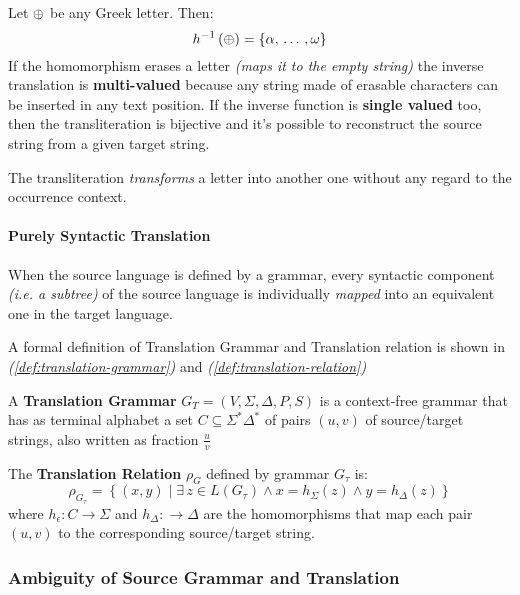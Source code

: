 \documentclass[english]{article}
\begin{document}
Let \(\oplus\) be any Greek letter.
Then:
\[ h^{-1}\left( \oplus \right) = \left\{ \alpha, \,\ldots\,, \omega \right\} \]
If the homomorphism erases a letter \textit{(maps it to the empty string)} the inverse translation is \textbf{multi-valued} because any string made of erasable characters can be inserted in any text position.
If the inverse function is \textbf{single valued} too, then the transliteration is bijective and it's possible to reconstruct the source string from a given target string.

\bigskip
The transliteration \textit{transforms} a letter into another one without any regard to the occurrence context.

\paragraph{Purely Syntactic Translation}

When the source language is defined by a grammar, every syntactic component \textit{(i.e. a subtree)} of the source language is individually \textit{mapped} into an equivalent one in the target language.

A formal definition of Translation Grammar and Translation relation is shown in \textit{(\ref{def:translation-grammar})} and \textit{(\ref{def:translation-relation})}

\begin{definition}
  \label{def:translation-grammar}
  A \textbf{Translation Grammar} \(G_T = \left( V, \Sigma, \Delta, P, S \right)\) is a context-free grammar that has as terminal alphabet a set \(C \subseteq \Sigma^\ast \Delta^\ast\) of pairs \(\left( u, v \right)\) of source/target strings, also written as fraction \(\frac{u}{v}\)
\end{definition}

\begin{definition}
  \label{def:translation-relation}
  The \textbf{Translation Relation} \(\rho_G\) defined by grammar \(G_\tau\) is:
  \[ \rho_{G_\tau}  = \left\{ \left( x, y \right) \mid \exists \, z \in L\left( G_\tau \right) \land x = h_\Sigma \left( z \right) \land y = h_\Delta \left( z \right) \right\} \]
  where \(h_\epsilon : C \rightarrow \Sigma\) and \(h_\Delta : \rightarrow \Delta\) are the homomorphisms that map each pair \(\left( u, v \right)\) to the corresponding source/target string.
\end{definition}

\subsubsection{Ambiguity of Source Grammar and Translation}
\end{document}
